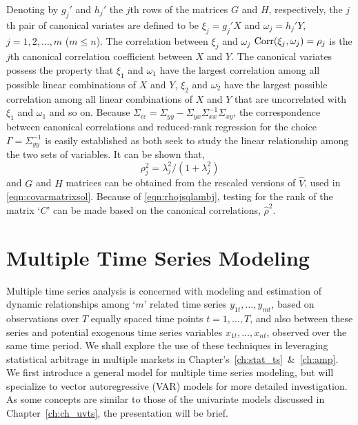 Denoting by $g_j'$ and $h_j'$ the $j$th rows of the matrices $G$ and $H$, respectively, the $j$th pair of canonical variates are defined to be $\xi_j= g_j' X$ and $\omega_j= h_j' Y$, $j= 1, 2, \ldots, m$ ($m \leq n$). The correlation between $\xi_j$ and $\omega_j$ $\operatorname{Corr}(\xi_j, \omega_j)= \rho_j$ is the $j$th canonical correlation coefficient between $X$ and $Y$. The canonical variates possess the property that $\xi_1$ and $\omega_1$ have the largest correlation among all possible linear combinations of $X$ and $Y$, $\xi_2$ and $\omega_2$ have the largest possible correlation among all linear combinations of $X$ and $Y$ that are uncorrelated with $\xi_1$ and $\omega_1$ and so on. Because $\Sigma_{\epsilon\epsilon}= \Sigma_{yy} - \Sigma_{yx} \Sigma_{xx}^{-1} \Sigma_{xy}$, the correspondence between canonical correlations and reduced-rank regression for the choice $\Gamma= \Sigma_{yy}^{-1}$ is easily established as both seek to study the linear relationship among the two sets of variables. It can be shown that,
	\begin{equation} \label{eqn:rhojsqlambj}
	\rho_j^2= \lambda_j^2 / (1+\lambda_j^2)
	\end{equation}
and $G$ and $H$ matrices can be obtained from the rescaled versions of $\hat{V}$, used in \eqref{eqn:covarmatrixsol}. Because of \eqref{eqn:rhojsqlambj}, testing for the rank of the matrix `$C$' can be made based on the canonical correlations, $\hat{\rho}^2$.



\section{Multiple Time Series Modeling}


Multiple time series analysis is concerned with modeling and estimation of dynamic relationships among `$m$' related time series $y_{1t}, \ldots, y_{mt}$, based on observations over $T$ equally spaced time points $t= 1, \ldots, T$, and also between these series and potential exogenous time series variables $x_{1t}, \ldots, x_{nt}$, observed over the same time period. We shall explore the use of these techniques in leveraging statistical arbitrage in multiple markets in Chapter's~\ref{ch:stat_ts}~\&~\ref{ch:amp}. We first introduce a general model for multiple time series modeling, but will specialize to vector autoregressive (VAR) models for more detailed investigation. As some concepts are similar to those of the univariate models discussed in Chapter~\ref{ch:ch_uvts}, the presentation will be brief.


